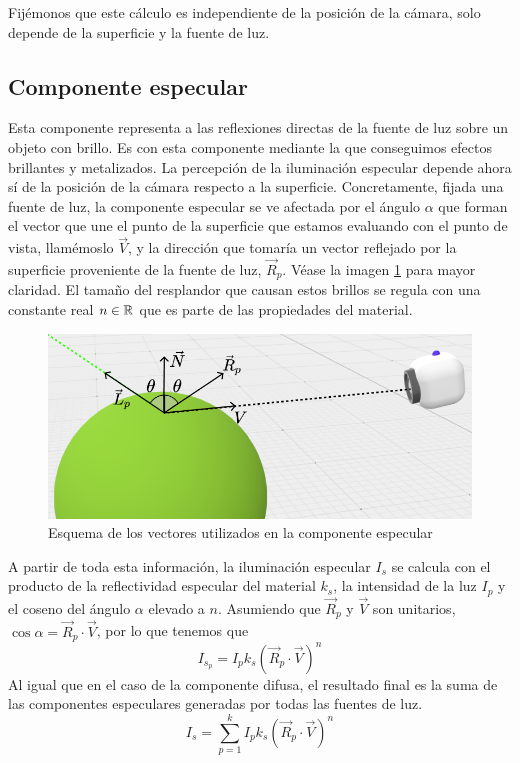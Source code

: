 Fijémonos que este cálculo es independiente de la posición de la cámara, solo depende de la superficie y la fuente de luz.

\subsection{Componente especular}

Esta componente representa a las reflexiones directas de la fuente de luz sobre un objeto con brillo. Es con esta componente mediante la que conseguimos efectos brillantes y metalizados. La percepción de la iluminación especular depende ahora sí de la posición de la cámara respecto a la superficie. Concretamente, fijada una fuente de luz, la componente especular se ve afectada por el ángulo $\alpha$ que forman el vector que une el punto de la superficie que estamos evaluando con el punto de vista, llamémoslo  $\vec V$, y la dirección que tomaría un vector reflejado por la superficie proveniente de la fuente de luz, $\vec R_p$. Véase la imagen \ref{fig:especular} para mayor claridad. El tamaño del resplandor que causan estos brillos se regula con una constante real $n\in\mathbb{R}$ que es parte de las propiedades del material.

\begin{figure} [ht]
    \centering
    \includegraphics[scale = 0.35]{img/C8/especular.png}
    \caption{Esquema de los vectores utilizados en la componente especular}
    \label{fig:especular}
\end{figure}

A partir de toda esta información, la iluminación especular $I_s$ se calcula con el producto de la reflectividad especular del material $k_s$, la intensidad de la luz $I_p$ y el coseno del ángulo $\alpha$ elevado a $n$. Asumiendo que $\vec R_p$ y $\vec V$ son unitarios, $\cos\alpha=\vec R_p\cdot \vec V$, por lo que tenemos que
\begin{equation}
    I_{s_p} = I_p k_s (\vec R_p\cdot \vec V)^n
\end{equation}   
Al igual que en el caso de la componente difusa, el resultado final es la suma de las componentes especulares generadas por todas las fuentes de luz.
\begin{equation}
    I_s = \sum_{p=1}^k I_p k_s (\vec R_p \cdot \vec V)^n
\end{equation}

